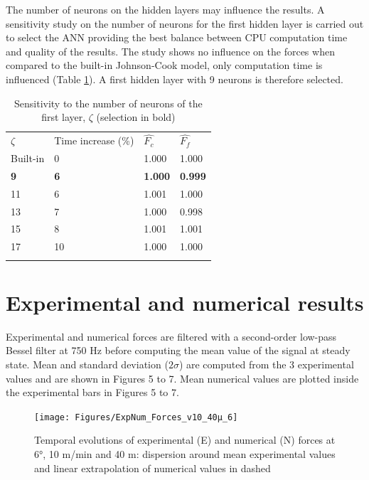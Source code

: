 \documentclass[final,5p,times,twocolumn]{elsarticle}
\begin{document}
The number of neurons on the hidden layers may influence the results. A sensitivity study on the number of neurons for the first hidden layer is carried out to select the ANN providing the best balance between CPU computation time and quality of the results. The study shows no influence on the forces when compared to the built-in Johnson-Cook model, only computation time is influenced (Table \ref{tab:NbNeurons}). A first hidden layer with 9 neurons is therefore selected.

%
\begin{table}[!h]
\begin{center}
\caption{\label{tab:NbNeurons} Sensitivity to the number of neurons of the first layer, $\zeta$
(selection in bold)}
\begin{tabular}{llll}
\hline\noalign{\smallskip}
$\zeta$  & Time increase (\%) & $\hat{F_c}$ & $\hat{F_f}$\\
\noalign{\smallskip}\hline\noalign{\smallskip}
Built-in & 0 & 1.000 & 1.000\\
\textbf{9} & \textbf{6} & \textbf{1.000} & \textbf{0.999}\\
11 & 6 & 1.001 & 1.000\\
13 & 7 & 1.000 & 0.998\\
15 & 8 & 1.001 & 1.001\\
17 & 10 & 1.000 & 1.000\\
\noalign{\smallskip}\hline
\end{tabular}
\end{center}
\end{table}
%

\section{Experimental and numerical results\label{sec:ExpNumResults}}
\label{Results}

Experimental and numerical forces are filtered with a second-order low-pass Bessel filter at 750 Hz before computing the mean value of the signal at steady state. Mean and standard deviation ($2\sigma$) are computed from the 3 experimental values and are shown in Figures 5 to 7. Mean numerical values are plotted inside the experimental bars in Figures 5 to 7.

\begin{figure}[h]
\centering
\texttt{[image: Figures/ExpNum\_Forces\_v10\_40µ\_6]}
\caption{Temporal evolutions of experimental (E) and numerical (N) forces at 6°, 10 m/min and 40 \textmu{}m: dispersion around mean experimental values and linear extrapolation of numerical values in dashed}
\label{ExpNum_Forces_v10_40µ_6}
\end{figure}
\end{document}
